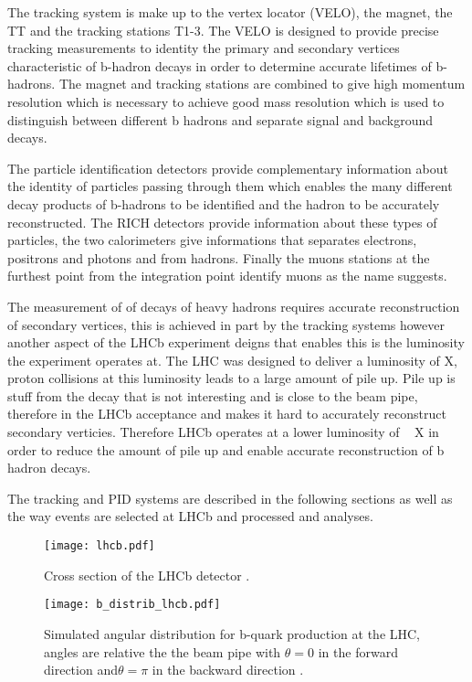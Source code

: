 The tracking system is make up to the vertex locator (VELO), the magnet, the TT and the tracking stations T1-3. The VELO is designed to provide precise tracking measurements to identity the primary and secondary vertices characteristic of b-hadron decays in order to determine accurate lifetimes of b-hadrons. The magnet and tracking stations are combined to give high momentum resolution which is necessary to achieve good mass resolution which is used to distinguish between different b hadrons and separate signal and background decays.

The particle identification detectors provide complementary information about the identity of particles passing through them which enables the many different decay products of b-hadrons to be identified and the hadron to be accurately reconstructed. The RICH detectors provide information about these types of particles, the two calorimeters give informations that separates electrons, positrons and photons and from hadrons. Finally the muons stations at the furthest point from the integration point identify muons as the name suggests. 

The measurement of of decays of heavy hadrons requires accurate reconstruction of secondary vertices, this is achieved in part by the tracking systems however another aspect of the LHCb experiment deigns that enables this is the luminosity the experiment operates at. The LHC was designed to deliver a luminosity of X, proton collisions at this luminosity leads to a large amount of pile up. Pile up is stuff from the decay that is not interesting and is close to the beam pipe, therefore in the LHCb acceptance and makes it hard to accurately reconstruct secondary verticies. Therefore LHCb operates at a lower luminosity of ~ X in order to reduce the amount of pile up and enable accurate reconstruction of b hadron decays. 

The tracking and PID systems are described in the following sections as well as the way events are selected at LHCb and processed and analyses. 



\begin{figure}[tb] 
  \centering    
  \texttt{[image: lhcb.pdf]}
  \caption{Cross section of the LHCb detector \cite{LHCb:2003ab}.}
  \label{fig:LHCb_detector}
\end{figure}




\begin{figure}[tb] 
  \centering    
  \texttt{[image: b\_distrib\_lhcb.pdf]}
  \caption{Simulated angular distribution for b-quark production at the LHC, angles are relative the the beam pipe with $\theta =0$ in the forward direction and$\theta = \pi$  in the backward direction \cite{Amato:1998xt}.}
  \label{fig:LHCb_detector}
\end{figure}


